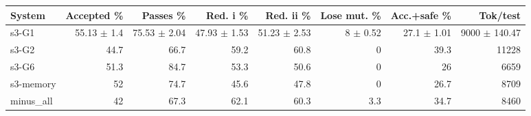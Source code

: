 \begin{tabular}{lrrrrrrr}
\toprule
System & Accepted \% & Passes \% & Red. i \% & Red. ii \% & Lose mut. \% & Acc.+safe \% & Tok/test \\
\midrule
s3-G1 & 55.13 $\pm$ 1.4 & 75.53 $\pm$ 2.04 & 47.93 $\pm$ 1.53 & 51.23 $\pm$ 2.53 & 8 $\pm$ 0.52 & 27.1 $\pm$ 1.01 & 9000 $\pm$ 140.47 \\
s3-G2 & 44.7 & 66.7 & 59.2 & 60.8 & 0 & 39.3 & 11228 \\
s3-G6 & 51.3 & 84.7 & 53.3 & 50.6 & 0 & 26 & 6659 \\
s3-memory & 52 & 74.7 & 45.6 & 47.8 & 0 & 26.7 & 8709 \\
minus_all & 42 & 67.3 & 62.1 & 60.3 & 3.3 & 34.7 & 8460 \\
\bottomrule
\end{tabular}
